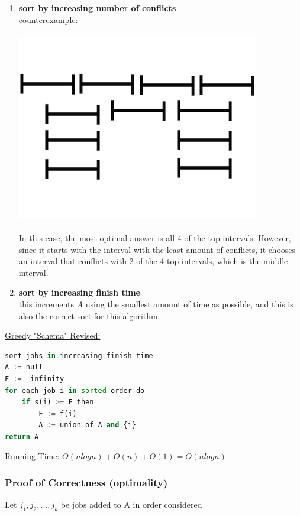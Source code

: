 \documentclass[12pt]{article}
\begin{document}
\begin{enumerate}
{	}
	\item{
	\textbf{sort by increasing number of conflicts}\\
	counterexample:\\
	\\
	\includegraphics{interval4}\\
	\\
	In this case, the most optimal answer is all 4 of the top intervals. However, since it starts with the interval with the least amount of conflicts, it chooses an interval that conflicts with 2 of the 4 top intervals, which is the middle interval.
	}
	\item{
	\textbf{sort by increasing finish time}\\
	this increments $A$ using the smallest amount of time as possible, and this is also the correct sort for this algorithm.
	\\
	}
\end{enumerate}

\underline{Greedy "Schema" Revised:}\\
\begin{lstlisting}[language=Python]
sort jobs in increasing finish time
A := null
F := -infinity
for each job i in sorted order do
	if s(i) >= F then
		F := f(i)
		A := union of A and {i}
return A
\end{lstlisting}

\underline{Running Time:} $O(nlogn) + O(n) + O(1) = O(nlogn)$

\subsubsection{Proof of Correctness (optimality)}

Let $j_1, j_2, ... , j_k$ be jobs added to A in order considered
\end{document}
